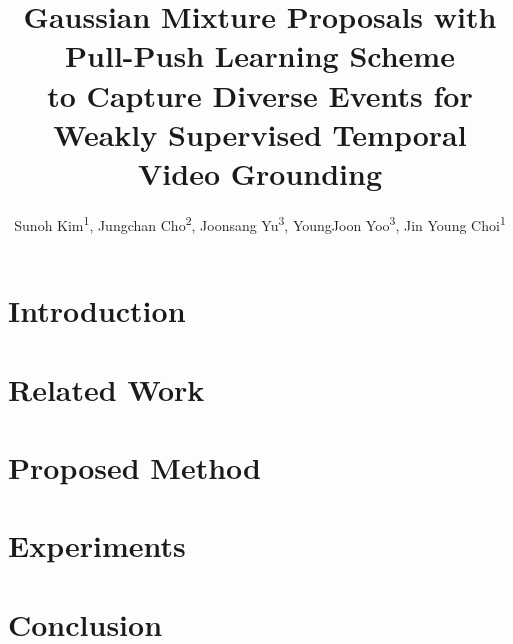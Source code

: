 \documentclass[letterpaper]{article} %
\title{Gaussian Mixture Proposals with Pull-Push Learning Scheme \\
to Capture Diverse Events for Weakly Supervised Temporal Video Grounding}
\author {
    Sunoh Kim\textsuperscript{\rm 1},
    Jungchan Cho\textsuperscript{\rm 2},
    Joonsang Yu\textsuperscript{\rm 3},
    YoungJoon Yoo\textsuperscript{\rm 3},
    Jin Young Choi\textsuperscript{\rm 1}
}
\begin{document}
\maketitle

\begin{abstract}

\end{abstract}

\section{Introduction}


\section{Related Work}


\section{Proposed Method}


\section{Experiments}


\section{Conclusion}









% 
\end{document}
